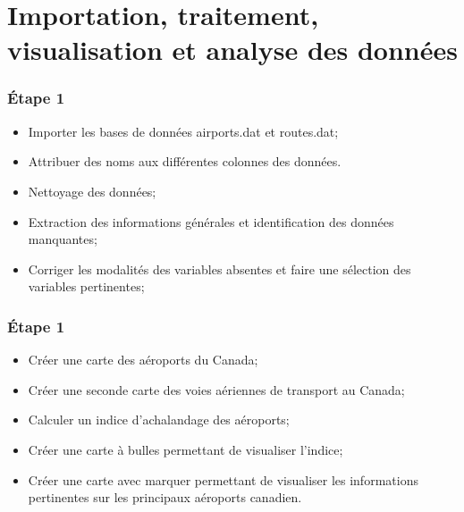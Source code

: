 \section{Importation, traitement, visualisation et analyse des données}
 
\begin{frame}[fragile=singleslide]
  \frametitle{Étape 1}

\begin{itemize}
\item Importer les bases de données airports.dat et routes.dat;
\item Attribuer des noms aux différentes colonnes des données.
\item Nettoyage des données;
\item Extraction des informations générales et identification des données manquantes;
\item Corriger les modalités des variables absentes et faire une sélection des variables pertinentes;
\end{itemize}
\end{frame}

\begin{frame}[fragile=singleslide]
  \frametitle{Étape 1}
\begin{itemize}
\item Créer une carte des aéroports du Canada;
\item Créer une seconde carte des voies aériennes de transport au Canada;
\item Calculer un indice d'achalandage des aéroports;
\item Créer une carte à bulles permettant de visualiser l'indice;
\item Créer une carte avec marquer permettant de visualiser les informations pertinentes sur les principaux aéroports canadien.
\end{itemize}
\end{frame}

